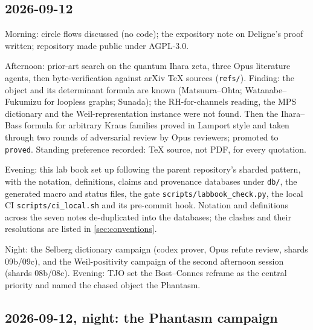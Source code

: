 \subsection*{2026-09-12}

Morning: circle flows discussed (no code); the expository note on Deligne's
proof written; repository made public under AGPL-3.0.

Afternoon: prior-art search on the quantum Ihara zeta, three Opus literature
agents, then byte-verification against arXiv TeX sources (\texttt{refs/}).
Finding: the object and its determinant formula are known
(Matsuura--Ohta; Watanabe--Fukumizu for loopless graphs; Sunada); the
RH-for-channels reading, the MPS dictionary and the Weil-representation
instance were not found. Then the Ihara--Bass formula for arbitrary Kraus
families proved in Lamport style and taken through two rounds of adversarial
review by Opus reviewers; promoted to \texttt{proved}. Standing preference
recorded: TeX source, not PDF, for every quotation.

Evening: this lab book set up following the parent repository's sharded
pattern, with the notation, definitions, claims and provenance databases
under \texttt{db/}, the generated macro and status files, the gate
\texttt{scripts/labbook\_check.py}, the local CI \texttt{scripts/ci\_local.sh}
and its pre-commit hook. Notation and definitions across the seven notes
de-duplicated into the databases; the clashes and their resolutions are
listed in \cref{sec:conventions}.

Night: the Selberg dictionary campaign (codex prover, Opus refute review, shards
09b/09c), and the Weil-positivity campaign of the second afternoon session (shards
08b/08c). Evening: TJO set the Bost--Connes reframe as the central priority and named the
chased object the Phantasm.

\subsection*{2026-09-12, night: the Phantasm campaign}

